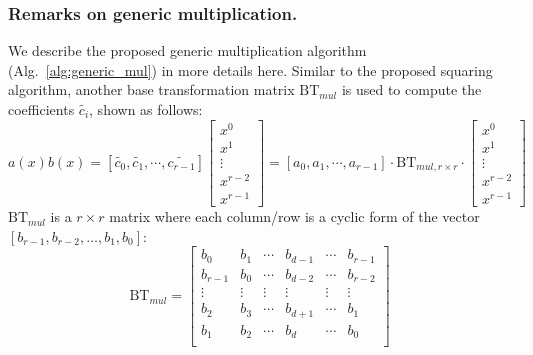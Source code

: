 \documentclass[runningheads]{llncs}
\begin{document}
\subsubsection{Remarks on generic multiplication.}
We describe the proposed generic multiplication algorithm (Alg.~\ref{alg:generic_mul}) in more details here. Similar to the proposed squaring algorithm,
another base transformation matrix $\text{BT}_{mul}$ is used to compute the coefficients $\widetilde{c_{i}}$, shown as follows:
\[
a(x)b(x)= [\widetilde{c_{0}},\widetilde{c_{1}},\cdots,\widetilde{c_{r-1}}]\left[ \begin{array}{c}
x^{0} \\
x^{1} \\
\vdots\\
x^{r-2}\\
x^{r-1}
\end{array}
\right ]
=
[{a_{0}},{a_{1}},\cdots,{a_{r-1}}]
\cdot \text{BT}_{mul,r\times r} \cdot
\left[ \begin{array}{c}
x^{0} \\
x^{1} \\
\vdots\\
x^{r-2}\\
x^{r-1}
\end{array}
\right ]
\]
$\text{BT}_{mul}$ is a $r\times r$ matrix where each column/row is a cyclic form of the vector $[b_{r-1},b_{r-2},\ldots, b_{1},b_{0}]$:
\[
\text{BT}_{mul} =
\left[ \begin{array}{cccccc}
b_{0}&b_{1}&\cdots&b_{d-1}&\cdots &b_{r-1} \\
b_{r-1}&b_{0}&\cdots&b_{d-2}&\cdots &b_{r-2} \\
\vdots&\vdots&\vdots&\vdots&\vdots&\vdots\\
b_{2}&b_{3}&\cdots&b_{d+1}&\cdots &b_{1} \\
b_{1}&b_{2}&\cdots&b_{d}&\cdots &b_{0} \\
\end{array}
\right ]
\]
\end{document}
